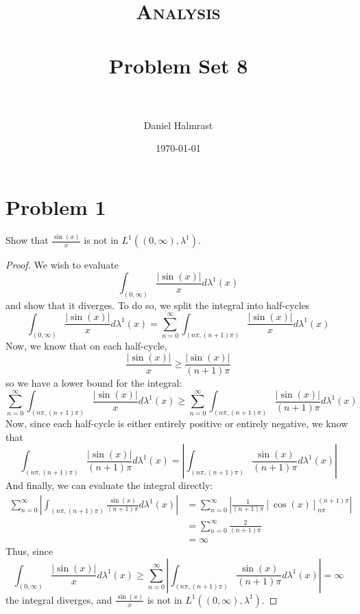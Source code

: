 \documentclass[fontsize=11pt]{scrartcl} %
\title{	
\normalfont \normalsize 
\textsc{Analysis} \\ [25pt] %
\horrule{0.5pt} \\[0.4cm] %
\huge Problem Set 8 \\ %
\horrule{2pt} \\[0.5cm] %
}
\author{Daniel Halmrast} %
\date{\normalsize\today} %
\numberwithin{equation}{section} %
\numberwithin{figure}{section} %
\numberwithin{table}{section} %
\begin{document}
\maketitle %

\section*{Problem 1}
Show that $\frac{\sin(x)}{x}$ is not in $L^1((0,\infty),\lambda^1)$.
\\
\begin{proof}
We wish to evaluate
    \[
        \int_{(0,\infty)}\frac{|\sin(x)|}{x}d\lambda^1(x)
    \]
    and show that it diverges. To do so, we split the integral into half-cycles
    \[
        \int_{(0,\infty)}\frac{|\sin(x)|}{x}d\lambda^1(x) = 
        \sum_{n=0}^{\infty} \int_{(n\pi,(n+1)\pi)}\frac{|\sin(x)|}{x}d\lambda^1(x)
    \]
    Now, we know that on each half-cycle,
    \[
        \frac{|\sin(x)|}{x} \geq \frac{|\sin(x)|}{(n+1)\pi}
    \]
    so we have a lower bound for the integral:
    \[
        \sum_{n=0}^{\infty}
        \int_{(n\pi,(n+1)\pi)}\frac{|\sin(x)|}{x}d\lambda^1(x)\geq
        \sum_{n=0}^{\infty}
        \int_{(n\pi,(n+1)\pi)}\frac{|\sin(x)|}{(n+1)\pi}d\lambda^1(x)
    \]
    Now, since each half-cycle is either entirely positive or entirely negative,
    we know that
    \[
        \int_{(n\pi,(n+1)\pi)}\frac{|\sin(x)|}{(n+1)\pi}d\lambda^1(x)=
        \left|\int_{(n\pi,(n+1)\pi)}\frac{\sin(x)}{(n+1)\pi}d\lambda^1(x)\right|
    \]
    And finally, we can evaluate the integral directly:
    \[
        \begin{aligned}
        \sum_{n=0}^{\infty}
        \left|\int_{(n\pi,(n+1)\pi)}\frac{\sin(x)}{(n+1)\pi}d\lambda^1(x)\right|
            &=
        \sum_{n=0}^{\infty}
            \left|\frac{1}{(n+1)\pi}[\cos(x)]_{n\pi}^{(n+1)\pi}\right|\\
            &=
        \sum_{n=0}^{\infty}
            \frac{2}{(n+1)\pi}\\
            &=\infty
        \end{aligned}
    \]
    Thus, since 
    \[
        \int_{(0,\infty)}\frac{|\sin(x)|}{x}d\lambda^1(x)\geq
        \sum_{n=0}^{\infty}
        \left|\int_{(n\pi,(n+1)\pi)}\frac{\sin(x)}{(n+1)\pi}d\lambda^1(x)\right|
        = \infty
    \]
    the integral diverges, and $\frac{\sin(x)}{x}$ is not in
    $L^1((0,\infty),\lambda^1)$.
\end{proof}

\newpage
\end{document}
